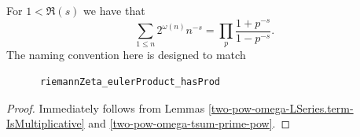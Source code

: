 \begin{theorem}
\label{two_pow_omega_LSeries_eulerProduct_hasProd}
\leanok
For $1<\Re(s)$ we have that
    $$\sum_{1\leq n}2^{\omega(n)}n^{-s}=\prod_p\frac{1+p^{-s}}{1-p^{-s}}.$$
    The naming convention here is designed to match
    \begin{verbatim}
      riemannZeta_eulerProduct_hasProd
    \end{verbatim}
\end{theorem}
\begin{proof}
\leanok
Immediately follows from Lemmas \ref{two-pow-omega-LSeries.term-IsMultiplicative} and \ref{two-pow-omega-tsum-prime-pow}.
\end{proof}
